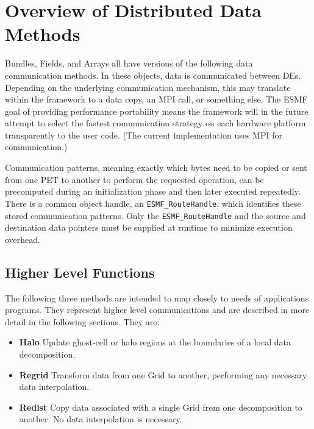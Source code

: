 
\section{Overview of Distributed Data Methods}

Bundles, Fields, and Arrays all have versions of the following
data communication methods.  In these objects, data is communicated 
between DEs.  Depending on the underlying communication 
mechanism, this may translate within the framework to a data 
copy, an MPI call, or something else.  
The ESMF goal of providing
performance portability means the framework will in the future
attempt to select the
fastest communication strategy on each hardware platform transparently 
to the user code.  (The current implementation uses MPI for communication.)

Communication patterns, meaning exactly which bytes need to be copied 
or sent from one PET to another to perform the requested operation,
can be precomputed during an initialization phase and then later 
executed repeatedly.
There is a common object handle, an {\tt ESMF\_RouteHandle}, which
identifies these stored communication patterns. 
Only the {\tt ESMF\_RouteHandle} and the source and destination 
data pointers must be supplied at runtime to minimize execution overhead.

\subsection{Higher Level Functions}
The following three methods are intended to map closely to 
needs of applications programs.  They represent higher level
communications and are described in more detail in the following
sections.  They are:

\begin{itemize}

\item {\bf Halo}
Update ghost-cell or halo regions at the boundaries
of a local data decomposition.
\item {\bf Regrid}
Transform data from one Grid to another, performing
any necessary data interpolation.
\item {\bf Redist}
Copy data associated with a single Grid from
one decomposition to another.  No data interpolation is necessary.

\end{itemize}

